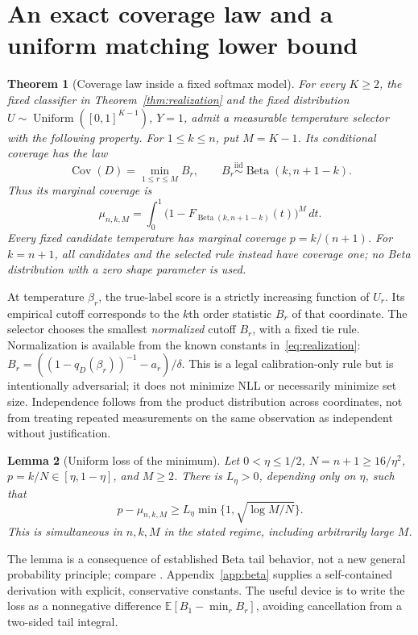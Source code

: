 \documentclass[10pt]{article}
\newtheorem{theorem}{Theorem}[section]
\newtheorem{lemma}[theorem]{Lemma}
\theoremstyle{definition}\newtheorem{definition}[theorem]{Definition}
\theoremstyle{remark}\newtheorem{remark}[theorem]{Remark}
\newcommand{\E}{\mathbb E}
\newcommand{\1}{\mathbf 1}
\newcommand{\Cov}{\operatorname{Cov}}
\newcommand{\Beta}{\operatorname{Beta}}
\begin{document}
\section{An exact coverage law and a uniform matching lower bound}\label{sec:lower}
\begin{theorem}[Coverage law inside a fixed softmax model]\label{thm:law}
For every $K\ge2$, the fixed classifier in Theorem~\ref{thm:realization} and the fixed distribution $U\sim\operatorname{Uniform}([0,1]^{K-1})$, $Y=1$, admit a measurable temperature selector with the following property. For $1\le k\le n$, put $M=K-1$. Its conditional coverage has the law
\begin{equation}\label{eq:minlaw}
 \Cov(D)=\min_{1\le r\le M} B_r,
 \qquad B_r\overset{\mathrm{iid}}\sim\Beta(k,n+1-k).
\end{equation}
Thus its marginal coverage is
\begin{equation}\label{eq:integral}
 \mu_{n,k,M}=\int_0^1\bigl(1-F_{\Beta(k,n+1-k)}(t)\bigr)^M\,dt.
\end{equation}
Every fixed candidate temperature has marginal coverage $p=k/(n+1)$. For $k=n+1$, all candidates and the selected rule instead have coverage one; no Beta distribution with a zero shape parameter is used.
\end{theorem}
At temperature $\beta_r$, the true-label score is a strictly increasing function of $U_r$. Its empirical cutoff corresponds to the $k$th order statistic $B_r$ of that coordinate. The selector chooses the smallest \emph{normalized} cutoff $B_r$, with a fixed tie rule. Normalization is available from the known constants in~\eqref{eq:realization}: $B_r=((1-q_D(\beta_r))^{-1}-a_r)/\delta$. This is a legal calibration-only rule but is intentionally adversarial; it does not minimize NLL or necessarily minimize set size. Independence follows from the product distribution across coordinates, not from treating repeated measurements on the same observation as independent without justification.

\begin{lemma}[Uniform loss of the minimum]\label{lem:uniform}
Let $0<\eta\le1/2$, $N=n+1\ge16/\eta^2$, $p=k/N\in[\eta,1-\eta]$, and $M\ge2$. There is $L_\eta>0$, depending only on $\eta$, such that
\begin{equation}\label{eq:uniformmin}
 p-\mu_{n,k,M}\ge L_\eta\min\{1,\sqrt{\log M/N}\}.
\end{equation}
This is simultaneous in $n,k,M$ in the stated regime, including arbitrarily large $M$.
\end{lemma}
The lemma is a consequence of established Beta tail behavior, not a new general probability principle; compare \citet[Theorem 8]{zhang2020}. Appendix~\ref{app:beta} supplies a self-contained derivation with explicit, conservative constants. The useful device is to write the loss as a nonnegative difference $\E[B_1-\min_r B_r]$, avoiding cancellation from a two-sided tail integral.
\end{document}
